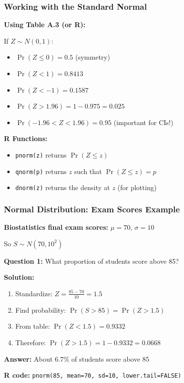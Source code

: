 \documentclass{beamer}
\begin{document}
\begin{frame}
\frametitle{Working with the Standard Normal}
\textbf{Using Table A.3 (or R):}

\vspace{0.3cm}
If $Z \sim N(0, 1)$:
\begin{itemize}
\item $\Pr(Z \leq 0) = 0.5$ (symmetry)
\item $\Pr(Z < 1) = 0.8413$
\item $\Pr(Z < -1) = 0.1587$
\item $\Pr(Z > 1.96) = 1 - 0.975 = 0.025$
\item $\Pr(-1.96 < Z < 1.96) = 0.95$ (important for CIs!)
\end{itemize}

\vspace{0.5cm}
\textbf{R Functions:}
\begin{itemize}
\item \texttt{pnorm(z)} returns $\Pr(Z \leq z)$
\item \texttt{qnorm(p)} returns $z$ such that $\Pr(Z \leq z) = p$
\item \texttt{dnorm(z)} returns the density at $z$ (for plotting)
\end{itemize}
\end{frame}

\begin{frame}
\frametitle{Normal Distribution: Exam Scores Example}
\textbf{Biostatistics final exam scores:} $\mu = 70$, $\sigma = 10$

\vspace{0.3cm}
So $S \sim N(70, 10^2)$

\vspace{0.5cm}
\textbf{Question 1:} What proportion of students score above 85?

\vspace{0.2cm}
\textbf{Solution:}
\begin{enumerate}
\item Standardize: $Z = \frac{85 - 70}{10} = 1.5$
\item Find probability: $\Pr(S > 85) = \Pr(Z > 1.5)$
\item From table: $\Pr(Z < 1.5) = 0.9332$
\item Therefore: $\Pr(Z > 1.5) = 1 - 0.9332 = 0.0668$
\end{enumerate}

\vspace{0.3cm}
\textbf{Answer:} About 6.7\% of students score above 85

\vspace{0.3cm}
\textbf{R code:} \texttt{pnorm(85, mean=70, sd=10, lower.tail=FALSE)}
\end{frame}
\end{document}
